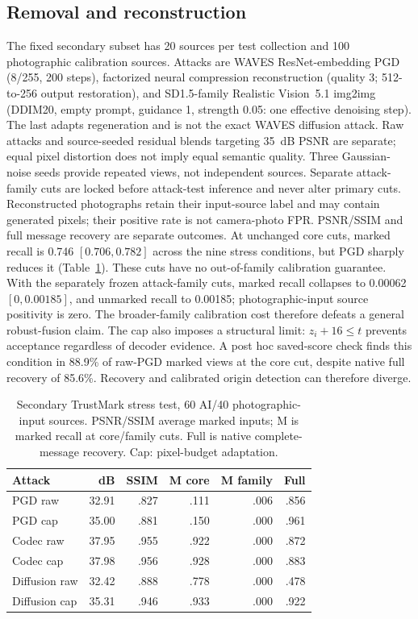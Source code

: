 \documentclass[conference]{IEEEtran}
\begin{document}
\subsection{Removal and reconstruction}
The fixed secondary subset has 20 sources per test collection and 100
photographic calibration sources. Attacks are WAVES ResNet-embedding PGD
(8/255, 200 steps), factorized neural compression reconstruction
(quality 3; 512-to-256 output restoration),
and SD1.5-family Realistic Vision~5.1 img2img
(DDIM20, empty prompt, guidance 1, strength 0.05: one effective denoising step).
The last adapts regeneration and is not the exact WAVES diffusion attack.
Raw attacks and source-seeded residual blends targeting 35~dB PSNR are separate;
equal pixel distortion does not imply equal semantic quality.
Three Gaussian-noise seeds provide repeated views, not independent sources.
Separate attack-family cuts are locked before attack-test inference and never
alter primary cuts. Reconstructed photographs retain their input-source label
and may contain generated pixels; their positive rate is not camera-photo FPR.
PSNR/SSIM and full message recovery are separate outcomes.
At unchanged core cuts, marked recall is 0.746 $[0.706,0.782]$ across the nine
stress conditions, but PGD sharply reduces it (Table~\ref{tab:attacks}).
These cuts have no out-of-family calibration guarantee. With the separately
frozen attack-family cuts, marked recall collapses to 0.00062
$[0,0.00185]$, and unmarked recall to 0.00185; photographic-input source
positivity is zero. The broader-family calibration cost therefore defeats a
general robust-fusion claim.
The cap also imposes a structural limit: $z_i+16\le t$ prevents acceptance
regardless of decoder evidence. A post hoc saved-score check finds this condition
in 88.9\% of raw-PGD marked views at the core cut, despite native full recovery
of 85.6\%. Recovery and calibrated origin detection can therefore diverge.

\begin{table}[t]
\caption{Secondary TrustMark stress test, 60 AI/40 photographic-input sources.
PSNR/SSIM average marked inputs; M is marked recall at core/family cuts.
Full is native complete-message recovery. Cap: pixel-budget adaptation.}
\label{tab:attacks}\centering\footnotesize\setlength{\tabcolsep}{3pt}
\begin{tabular}{lrrrrr}\toprule
Attack & dB & SSIM & M core & M family & Full\\\midrule
PGD raw & 32.91 & .827 & .111 & .006 & .856\\
PGD cap & 35.00 & .881 & .150 & .000 & .961\\
Codec raw & 37.95 & .955 & .922 & .000 & .872\\
Codec cap & 37.98 & .956 & .928 & .000 & .883\\
Diffusion raw & 32.42 & .888 & .778 & .000 & .478\\
Diffusion cap & 35.31 & .946 & .933 & .000 & .922\\
\bottomrule\end{tabular}\end{table}
\end{document}
